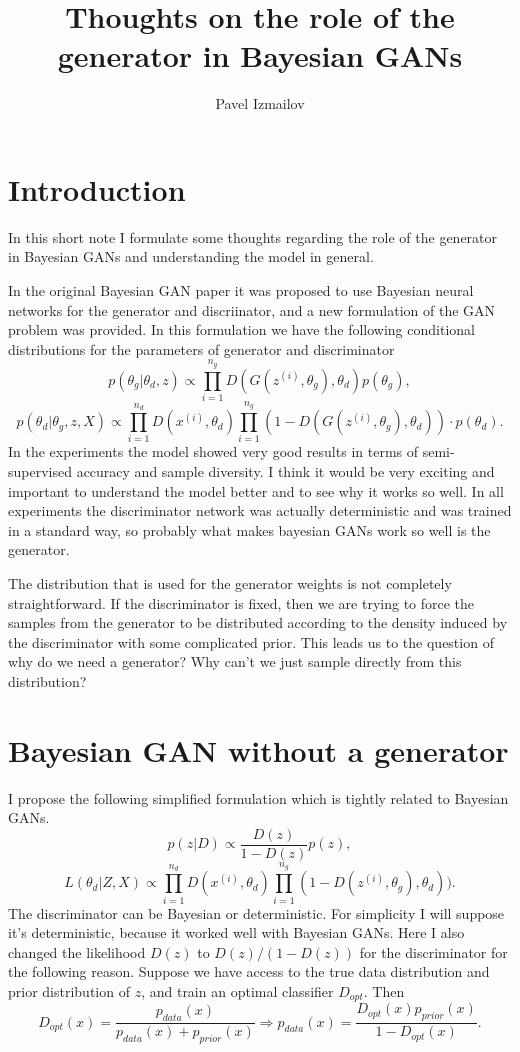 \documentclass[11pt]{article}
\title{Thoughts on the role of the generator in Bayesian GANs}
\author{Pavel Izmailov}
\begin{document}
\maketitle

\section{Introduction}

In this short note I formulate some thoughts regarding the role of the generator
in Bayesian GANs and understanding the model in general. 

In the original Bayesian GAN paper it was proposed to use Bayesian neural
networks for the generator and discriinator, and a new formulation of the GAN
problem was provided. In this formulation we have the following conditional 
distributions for the parameters of generator and discriminator
\[
  p(\theta_g \vert \theta_d, z) \propto 
  \prod_{i=1}^{n_g} D(G(z^{(i)}, \theta_g), \theta_d) p(\theta_g),
\]
\[
  p(\theta_d \vert \theta_g, z, X) \propto 
  \prod_{i=1}^{n_d} D(x^{(i)}, \theta_d)
  \prod_{i=1}^{n_g} (1 - D (G(z^{(i)}, \theta_g), \theta_d)) \cdot
  p(\theta_d).
\]
In the experiments the model showed very good results
in terms of semi-supervised accuracy and sample diversity. I think it would be
very exciting and important to understand the model better and to see why it
works so well. In all experiments the discriminator network was actually 
deterministic and was trained in a standard way, so probably what makes bayesian
GANs work so well is the generator. 

The distribution that is used for the generator weights is not 
completely straightforward. If the discriminator
is fixed, then we are trying to force the samples from the generator to be
distributed according to the density induced by the discriminator with some 
complicated prior. This leads us to the question of why do we need a generator?
Why can't we just sample directly from this distribution?

\pagebreak
\section{Bayesian GAN without a generator}

I propose the following simplified formulation which is tightly related to 
Bayesian GANs.
\[
  p(z \vert D) \propto \frac{D(z)}{1 - D(z)} p(z),
\]
\[
  L(\theta_d \vert Z, X) \propto 
  \prod_{i=1}^{n_d} D(x^{(i)}, \theta_d)
  \prod_{i=1}^{n_g} (1 - D(z^{(i)}, \theta_g), \theta_d)).
\]
The discriminator can be Bayesian or deterministic. For simplicity I will suppose
it's deterministic, because it worked well with Bayesian GANs. Here I also 
changed the likelihood $D(z)$ to $D(z) / (1-D(z))$ for the discriminator for the
following reason. Suppose we have access to the true data distribution and
prior distribution of $z$, and train an optimal classifier $D_{opt}$. Then
\[
  D_{opt}(x) = \frac{p_{data}(x)}{p_{data}(x) + p_{prior}(x)} \Rightarrow
  p_{data}(x) = \frac{D_{opt}(x) p_{prior}(x)}{1 - D_{opt}(x)}.
\]
\end{document}

